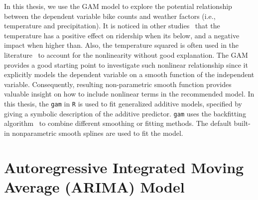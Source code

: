 \documentclass [11pt, proquest] {uwthesis}[2015/03/03]
\begin{document}
In this thesis, we use the GAM model to explore the potential relationship between the dependent variable bike counts and weather factors (i.e., temperature and precipitation). It is noticed in other studies~\cite{} that the temperature has a positive effect on ridership when its below, and a negative impact when higher than. Also, the temperature squared is often used in the literature~\cite{} to account for the nonlinearity without good explanation. The GAM provides a good starting point to investigate such nonlinear relationship since it explicitly models the dependent variable on a smooth function of the independent variable. Consequently, resulting non-parametric smooth function provides valuable insight on how to include nonlinear terms in the recommended model. In this thesis, the \texttt{gam} in \texttt{R} is used to fit generalized additive models, specified by giving a symbolic description of the additive predictor. \texttt{gam} uses the backfitting algorithm~\cite{} to combine different smoothing or fitting methods. The default built-in nonparametric smooth splines are used to fit the model. 

\section{Autoregressive Integrated Moving Average (ARIMA) Model}
\label{arimaintro}
\end{document}
